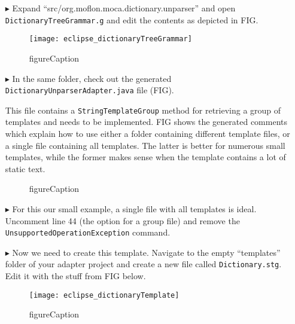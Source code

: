 \begin{itemize}

\item[$\blacktriangleright$] Expand ``src/org.moflon.moca.dictionary.unparser'' and open \texttt{DictionaryTreeGrammar.g} and edit the contents as depicted in
FIG. 

\begin{figure}[htpb]
\begin{center}
  \texttt{[image: eclipse\_dictionaryTreeGrammar]}
  \caption{figureCaption}
  \label{eclipse:treeGrammar}
\end{center}
\end{figure}

\item[$\blacktriangleright$] In the same folder, check out the generated \texttt{DictionaryUnparserAdapter.java} file (FIG). 

This file contains a \texttt{StringTemplateGroup} method for retrieving a group of templates and needs to be implemented. FIG shows the generated comments which
explain how to use either a folder containing different template files, or a single file containing all templates. The latter is better for numerous small
templates, while the former makes sense when the template contains a lot of static text.

\begin{figure}[htpb]
\begin{center}
  \caption{figureCaption}
  \label{eclipse:unparserCommented}
\end{center}
\end{figure}


\item[$\blacktriangleright$] For this our small example, a single file with all templates is ideal. Uncomment line 44 (the option for a group file) and remove
the \texttt{UnsupportedOperationException} command.

\item[$\blacktriangleright$] Now we need to create this template. Navigate to the empty ``templates'' folder of your adapter project and create a new file
called \texttt{Dictionary.stg}. Edit it with the stuff from FIG below.

\begin{figure}[htpb]
\begin{center}
  \texttt{[image: eclipse\_dictionaryTemplate]}
  \caption{figureCaption}
  \label{eclipse:dictionaryTemplate}
\end{center}
\end{figure}


\end{itemize}
